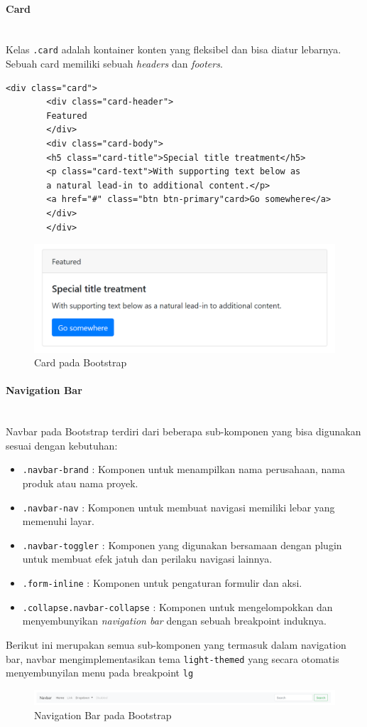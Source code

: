 \documentclass[a4paper,twoside]{article}
\newcommand{\myparagraph}[1]{\paragraph{#1}\mbox{}\\}
\begin{document}
\begin{enumerate}
		\myparagraph{Card}
		Kelas \colorbox{mygray}{\texttt{.card}} adalah kontainer konten yang fleksibel dan bisa diatur lebarnya. Sebuah card memiliki sebuah \textit{headers} dan \textit{footers}.
		
		\begin{lstlisting}[frame=single, basicstyle=\tiny]
		<div class="card">
		<div class="card-header">
		Featured
		</div>
		<div class="card-body">
		<h5 class="card-title">Special title treatment</h5>
		<p class="card-text">With supporting text below as 
		a natural lead-in to additional content.</p>
		<a href="#" class="btn btn-primary"card>Go somewhere</a>
		</div>
		</div>
		\end{lstlisting}
		
		\begin{figure} [H]
			\centering  
			\includegraphics[scale=1.0]{card_bootstrap.PNG}  
			\caption{Card pada Bootstrap} 
		\end{figure}
		
		\myparagraph{Navigation Bar}
		Navbar pada Bootstrap terdiri dari beberapa sub-komponen yang bisa digunakan sesuai dengan kebutuhan:
		\begin{itemize}
			\item \colorbox{mygray}{\texttt{.navbar-brand}} : Komponen untuk menampilkan nama perusahaan, nama produk atau nama proyek.
			\item \colorbox{mygray}{\texttt{.navbar-nav}} : Komponen untuk membuat navigasi memiliki lebar yang memenuhi layar.
			\item \colorbox{mygray}{\texttt{.navbar-toggler}} : Komponen yang digunakan bersamaan dengan plugin untuk membuat efek jatuh dan perilaku navigasi lainnya.
			\item \colorbox{mygray}{\texttt{.form-inline}} : Komponen untuk pengaturan formulir dan aksi.
			\item \colorbox{mygray}{\texttt{.collapse.navbar-collapse}} : Komponen untuk mengelompokkan dan menyembunyikan \textit{navigation bar} dengan sebuah breakpoint induknya.
		\end{itemize}
		Berikut ini merupakan semua sub-komponen yang termasuk dalam navigation bar, navbar mengimplementasikan tema \colorbox{mygray}{\texttt{light-themed}} yang secara otomatis menyembunyilan menu pada breakpoint \texttt{lg}
		\begin{figure} [H]
			\centering  
			\includegraphics[scale=1.0]{navbar_bootstrap.PNG}  
			\caption{Navigation Bar pada Bootstrap} 
		\end{figure}
		

\end{enumerate}
\end{document}

